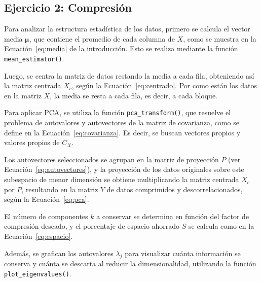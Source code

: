 \documentclass[a4paper,12pt]{article}
\begin{document}
\subsection*{Ejercicio 2: Compresión}

\vspace{1em}


Para analizar la estructura estadística de los datos, primero se calcula el vector media $\boldsymbol{\mu}$, que contiene el promedio de cada columna de $X$, como se muestra en la Ecuación~\ref{eq:media} de la introducción. Esto se realiza mediante la función \texttt{mean\_estimator()}.

Luego, se centra la matriz de datos restando la media a cada fila, obteniendo así la matriz centrada $X_c$, según la Ecuación~\ref{eq:centrado}. Por como están los datos en la matriz $X$, la media se resta a cada fila, es decir, a cada bloque.

\vspace{1em}



Para aplicar PCA, se utiliza la función \texttt{pca\_transform()}, que resuelve el problema de autovalores y autovectores de la matriz de covarianza, como se define en la Ecuación~\ref{eq:covarianza}. Es decir, se buscan vectores propios y valores propios de $C_X$.

Los autovectores seleccionados se agrupan en la matriz de proyección $P$ (ver Ecuación~\ref{eq:autovectores}), y la proyección de los datos originales sobre este subespacio de menor dimensión se obtiene multiplicando la matriz centrada $X_c$ por $P$, resultando en la matriz $Y$ de datos comprimidos y descorrelacionados, según la Ecuación~\ref{eq:pca}.

El número de componentes $k$ a conservar se determina en función del factor de compresión deseado, y el porcentaje de espacio ahorrado $S$ se calcula como en la Ecuación~\ref{eq:espacio}.

\vspace{1em}


Además, se grafican los autovalores $\lambda_{j}$ para visualizar cuánta información se conserva y cuánta se descarta al reducir la dimensionalidad, utilizando la función \texttt{plot\_eigenvalues()}.
\end{document}
